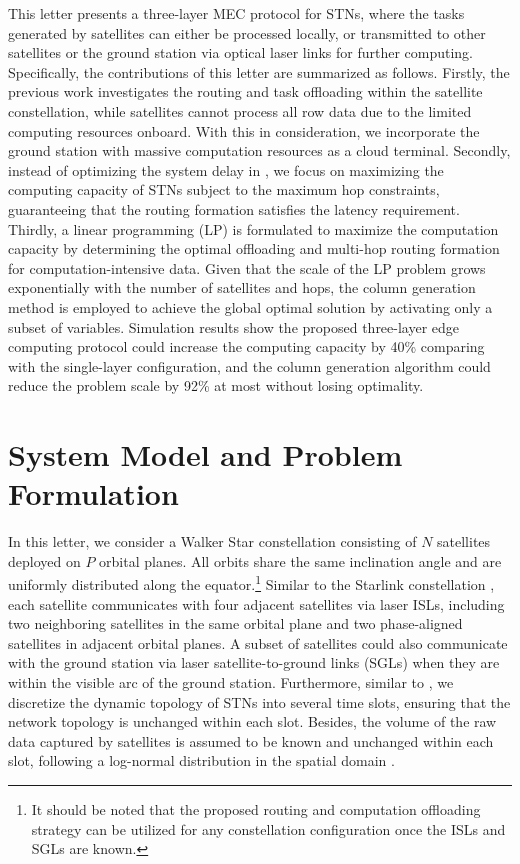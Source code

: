 \documentclass[journal,10pt]{IEEEtran}
\begin{document}
This letter presents a three-layer MEC protocol for STNs, where the tasks generated by satellites can either be processed locally, or transmitted to other satellites or the ground station via optical laser links for further computing.  Specifically, the contributions of this letter are summarized as follows. Firstly, the previous work \cite{cao2023computing} investigates the routing and task offloading within the satellite constellation, while satellites cannot process all row data due to the limited computing resources onboard. With this in consideration, we incorporate the ground station with massive computation resources as a cloud terminal. Secondly, instead of optimizing the system delay in \cite{wu2024multi,zhang2023satellite, cao2022edge,zhang2022aerial,cao2023computing}, we focus on maximizing the computing capacity of STNs subject to the maximum hop constraints, guaranteeing that the routing formation satisfies the latency requirement. Thirdly, a linear programming (LP) is formulated to maximize the computation capacity by determining the optimal offloading and multi-hop routing formation for computation-intensive data. Given that the scale of the LP problem grows exponentially with the number of satellites and hops, the column generation method is employed to achieve the global optimal solution by activating only a subset of variables. Simulation results show the proposed three-layer edge computing protocol could increase the computing capacity by 40\% comparing with the single-layer configuration, and the column generation algorithm could reduce the problem scale by 92\% at most without losing optimality.

\section{System Model and Problem Formulation}
\label{systemmodel}

In this letter, we consider a Walker Star constellation consisting of $N$ satellites deployed on $P$ orbital planes. All orbits share the same inclination angle and are uniformly distributed along the equator.\footnote{It should be noted that the proposed routing and computation offloading strategy can be utilized for any constellation configuration once the ISLs and SGLs are known.}  Similar to the Starlink constellation \cite{chaudhry2021laser}, each satellite communicates with four adjacent satellites via laser ISLs, including two neighboring satellites in the same orbital plane and two phase-aligned satellites in adjacent orbital planes. A subset of satellites could also communicate with the ground station via laser satellite-to-ground links (SGLs) when they are within the visible arc of the ground station. Furthermore, similar to \cite{wang2022cdmr}, we discretize the dynamic topology of STNs into several time slots, ensuring that the network topology is unchanged within each slot. Besides, the volume of the raw data captured by satellites is assumed to be known and unchanged within each slot, following a log-normal distribution in the spatial domain \cite{liao2023swarm,cao2023computing}.
\end{document}
